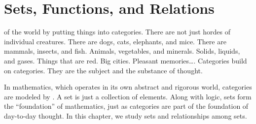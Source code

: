 \chapter{Sets, Functions, and Relations}\label{C-sets}

 of the world by putting
things into categories.  There are not just hordes of individual
creatures.  There are dogs, cats, elephants, and mice.  There are
mammals, insects, and fish.  Animals, vegetables, and minerals.
Solids, liquids, and gases.  Things that are red.  Big cities.
Pleasant memories\dots.  Categories build on categories.  They are the
subject and the substance of thought.

In mathematics, which operates in its own abstract and rigorous world,
categories are modeled by .  A set is just a collection of
elements.  Along with logic, sets form the ``foundation'' of
mathematics, just as categories are part of the foundation of
day-to-day thought.  In this chapter, we study sets and relationships
among sets.
